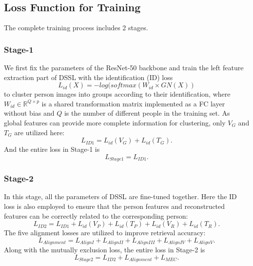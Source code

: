 \documentclass[sigconf]{acmart}
\begin{document}
\subsection{Loss Function for Training}
\label{sec:loss}
The complete training process includes 2 stages.

\subsubsection{Stage-1}
We first fix the parameters of the ResNet-50 backbone and train the left feature extraction part of DSSL with the identification (ID) loss 
\begin{equation}
	L_{id}(X) =  -log(softmax(W_{id} \times GN(X))
\end{equation}
to cluster person images into groups according to their identification, where $W_{id} \in \mathbb{R}^{Q \times p}$ is a shared transformation matrix implemented as a FC layer without bias and $Q$ is the number of different people in the training set. As global features can provide more complete information for clustering, only $V_{G}$ and $T_{G}$ are utilized here: 
\begin{equation}
	L_{ID1} = L_{id}(V_{G}) + L_{id}(T_{G}).
\end{equation}
And the entire loss in Stage-1 is
\begin{equation}
	L_{Stage1} = L_{ID1}.
\end{equation}

\subsubsection{Stage-2}
In this stage, all the parameters of DSSL are fine-tuned together. Here the ID loss is also employed to ensure that the person features and reconstructed features can be correctly related to the corresponding person:
\begin{equation}
	L_{ID2} = L_{ID1} + L_{id}(V_{P}) + L_{id}(T_{P}) + L_{id}(V_{R}) + L_{id}(T_{R}).
\end{equation}
The five alignment losses are utilized to improve retrieval accuracy:
\begin{equation}
	L_{Alignment} = L_{AlignI} + L_{AlignII} + L_{AlignIII} + L_{AlignIV} + L_{AlignV}.
\end{equation}
Along with the mutually exclusion loss, the entire loss in Stage-2 is
\begin{equation}
	L_{Stage2} = L_{ID2} + L_{Alignment} + L_{MEC}.
\end{equation}
\end{document}
